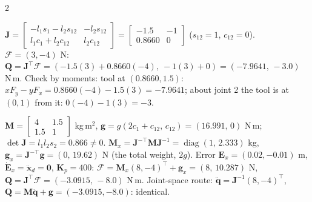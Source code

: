 \begin{multicols}{2}
\begin{wnfig}
\begin{center}
\end{center}
\cdlegend
{}
\end{wnfig}
\begin{wnfig}\end{wnfig}
\begin{worked}[$\mathbf Q=\mathbf J^\top\mathcal F$: planar 2R, $l_1=l_2=1$ m, $\mathbf q=(30^\circ,60^\circ)$]
$\mathbf J=\begin{bmatrix}-l_1s_1-l_2s_{12}&-l_2s_{12}\\l_1c_1+l_2c_{12}&l_2c_{12}\end{bmatrix}=\begin{bmatrix}-1.5&-1\\0.8660&0\end{bmatrix}$ ($s_{12}=1$, $c_{12}=0$). $\mathcal F=(3,-4)$ N: $\mathbf Q=\mathbf J^\top\mathcal F=(-1.5(3)+0.8660(-4),\ -1(3)+0)=(-7.9641,\,-3.0)$ N\,m. Check by moments: tool at $(0.8660,1.5)$: $xF_y-yF_x=0.8660(-4)-1.5(3)=-7.9641$; about joint 2 the tool is at $(0,1)$ from it: $0(-4)-1(3)=-3$. \chk
\end{worked}
\begin{worked}[Cartesian law gives the same torques as joint space; point masses $m_1=m_2=1$ kg at the link ends, same pose, at rest]
$\mathbf M=\begin{bmatrix}4&1.5\\1.5&1\end{bmatrix}$ kg\,m$^2$, $\mathbf g=g(2c_1+c_{12},\,c_{12})=(16.991,\,0)$ N\,m; $\det\mathbf J=l_1l_2s_2=0.866\ne0$. $\mathbf M_x=\mathbf J^{-\top}\mathbf M\mathbf J^{-1}=\operatorname{diag}(1,\,2.333)$ kg, $\mathbf g_x=\mathbf J^{-\top}\mathbf g=(0,\,19.62)$ N (the total weight, $2g$). Error $\mathbf E_x=(0.02,-0.01)$ m, $\dot{\mathbf E}_x=\ddot{\mathbf x}_d=\mathbf 0$, $\mathbf K_p=400$: $\mathcal F=\mathbf M_x(8,-4)^\top+\mathbf g_x=(8,\,10.287)$ N, $\mathbf Q=\mathbf J^\top\mathcal F=(-3.0915,\,-8.0)$ N\,m. Joint-space route: $\ddot{\mathbf q}=\mathbf J^{-1}(8,-4)^\top$, $\mathbf Q=\mathbf M\ddot{\mathbf q}+\mathbf g=(-3.0915,-8.0)$: identical. \chk

\end{worked}
\end{multicols}
